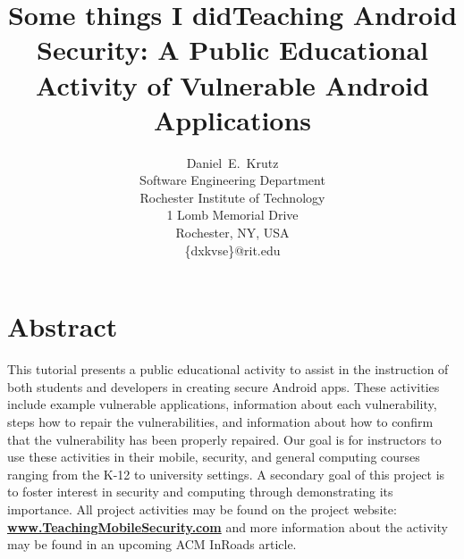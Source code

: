\documentclass[titlepage]{article}
\title{Some things I did}
\newcommand{\dan}[1]{\textcolor{blue}{{\it [Dan: #1]}}}
\begin{document}
\title{Teaching Android Security: A Public Educational Activity of Vulnerable Android Applications}



\author{
Daniel~E.~Krutz\\ 	
Software Engineering Department\\
Rochester Institute of Technology\\
1 Lomb Memorial Drive\\
Rochester, NY, USA \\
\{dxkvse\}@rit.edu
}

\date{} %

\maketitle




\section*{Abstract}



This tutorial presents a public educational activity to assist in the instruction of both students and developers in creating secure Android apps. These activities include example vulnerable applications, information about each vulnerability, steps how to repair the vulnerabilities, and information about how to confirm that the vulnerability has been properly repaired. Our goal is for instructors to use these activities in their mobile, security, and general computing courses ranging from the K-12 to university settings. A secondary goal of this project is to foster interest in security and computing through demonstrating its importance. All project activities may be found on the project website: \textbf{\url{www.TeachingMobileSecurity.com}} and more information about the activity may be found in an upcoming ACM InRoads article.
\end{document}
